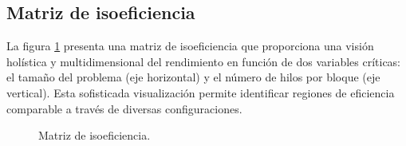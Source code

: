     \subsection{Matriz de isoeficiencia}

        La figura \ref{fig:daxpy_isoEfficiencyMatrix} presenta una matriz de isoeficiencia que proporciona una visión holística y multidimensional del rendimiento en función de dos variables críticas: el tamaño del problema (eje horizontal) y el número de hilos por bloque (eje vertical). Esta sofisticada visualización permite identificar regiones de eficiencia comparable a través de diversas configuraciones.

        \begin{figure}[H]
            \centering
            \caption{Matriz de isoeficiencia.}
            \label{fig:daxpy_isoEfficiencyMatrix}
        \end{figure}  
        
